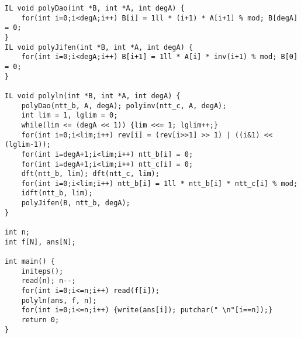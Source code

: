 \documentclass[UTF8]{ctexart}
\begin{document}
\begin{framed}
\begin{lstlisting}
IL void polyDao(int *B, int *A, int degA) {
    for(int i=0;i<degA;i++) B[i] = 1ll * (i+1) * A[i+1] % mod; B[degA] = 0;
}
IL void polyJifen(int *B, int *A, int degA) {
    for(int i=0;i<degA;i++) B[i+1] = 1ll * A[i] * inv(i+1) % mod; B[0] = 0;
}

IL void polyln(int *B, int *A, int degA) {
    polyDao(ntt_b, A, degA); polyinv(ntt_c, A, degA);
    int lim = 1, lglim = 0;
    while(lim <= (degA << 1)) {lim <<= 1; lglim++;}
    for(int i=0;i<lim;i++) rev[i] = (rev[i>>1] >> 1) | ((i&1) << (lglim-1));
    for(int i=degA+1;i<lim;i++) ntt_b[i] = 0;
    for(int i=degA+1;i<lim;i++) ntt_c[i] = 0;
    dft(ntt_b, lim); dft(ntt_c, lim);
    for(int i=0;i<lim;i++) ntt_b[i] = 1ll * ntt_b[i] * ntt_c[i] % mod;
    idft(ntt_b, lim);
    polyJifen(B, ntt_b, degA);
}

int n;
int f[N], ans[N];

int main() {
    initeps();
    read(n); n--;
    for(int i=0;i<=n;i++) read(f[i]);
    polyln(ans, f, n);
    for(int i=0;i<=n;i++) {write(ans[i]); putchar(" \n"[i==n]);}
    return 0;
}
\end{lstlisting}
\end{framed}
\end{document}
